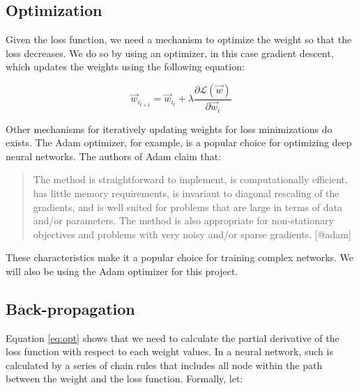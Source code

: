 \documentclass[12pt,a4paper,]{report}
\begin{document}
\hypertarget{optimization}{%
\subsection{Optimization}\label{optimization}}

Given the loss function, we need a mechanism to optimize the weight so
that the loss decreases. We do so by using an optimizer, in this case
gradient descent, which updates the weights using the following
equation:

\begin{equation}
    \vec{w}_{i_{t+1}} = \vec{w}_{i_{t}} + \lambda \frac{\partial \mathcal{L}(\vec{w})}{\partial \vec{w}_i} \label{eq:opt}
\end{equation}

Other mechanisms for iteratively updating weights for loss minimizations
do exists. The Adam optimizer, for example, is a popular choice for
optimizing deep neural networks. The authors of Adam claim that:

\begin{quote}
The method is straightforward to implement, is computationally
efficient, has little memory requirements, is invariant to diagonal
rescaling of the gradients, and is well suited for problems that are
large in terms of data and/or parameters. The method is also appropriate
for non-stationary objectives and problems with very noisy and/or sparse
gradients. {[}@adam{]}
\end{quote}

These characteristics make it a popular choice for training complex
networks. We will also be using the Adam optimizer for this project.

\hypertarget{back-propagation}{%
\subsection{Back-propagation}\label{back-propagation}}

Equation \ref{eq:opt} shows that we need to calculate the partial
derivative of the loss function with respect to each weight values. In a
neural network, such is calculated by a series of chain rules that
includes all node within the path between the weight and the loss
function. Formally, let:
\end{document}
